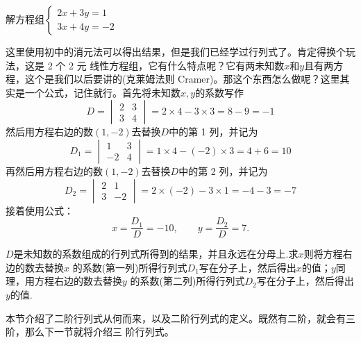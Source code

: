 \vfill
\begin{example}\label{exp:1.3}
    解方程组$\begin{cases}
        2x+3y=1\\
        3x+4y=-2
    \end{cases}$
\end{example}
\begin{solution}
    这里使用初中的消元法可以得出结果，但是我们已经学过行列式了。肯定得换个玩法，这是 2 个 2 元
    线性方程组，它有什么特点呢？它有两未知数$x$和$y$且有两方程，这个是我们以后要讲的(克莱姆法则
    Cramer)。那这个东西怎么做呢？这里其实是一个公式，记住就行。首先将未知数$x,y$的系数写作
    \[D=\begin{vmatrix}
        2 & 3\\
        3 & 4
    \end{vmatrix}=2\times 4-3\times 3=8-9=-1\]
    然后用方程右边的数$(1,-2)$去替换$D$中的第 1 列，并记为
    \[D_1=\begin{vmatrix}
        1 & 3\\
        -2 & 4
    \end{vmatrix}=1\times 4-(-2)\times 3=4+6=10\]
    再然后用方程右边的数$(1,-2)$去替换$D$中的第 2 列，并记为
    \[D_2=\begin{vmatrix}
        2 & 1\\
        3 & -2
    \end{vmatrix}=2\times(-2)-3\times 1=-4-3=-7\]
    接着使用公式：
    \[x=\dfrac{D_1}{D}=-10,\quad\quad y=\dfrac{D_2}{D}=7.\]
\end{solution}

\begin{remark}
    $D$是未知数的系数组成的行列式所得到的结果，并且永远在分母上.求$x$则将方程右边的数去替换$x$
    的系数(第一列)所得行列式$D_1$写在分子上，然后得出$x$的值；$y$同理，用方程右边的数去替换$y$
    的系数(第二列)所得行列式$D_2$写在分子上，然后得出$y$的值.
\end{remark}

本节介绍了二阶行列式从何而来，以及二阶行列式的定义。既然有二阶，就会有三阶，那么下一节就将介绍三
阶行列式。